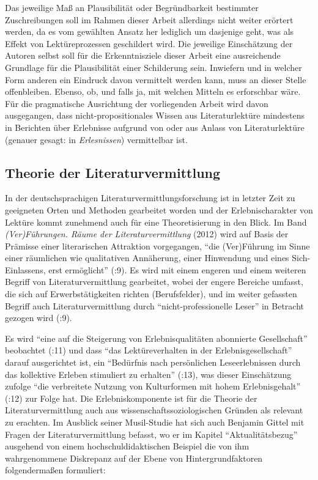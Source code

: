 \documentclass[fontsize=12pt]{scrartcl}
\begin{document}
Das jeweilige Ma{\ss} an Plausibilit\"at oder Begr\"undbarkeit bestimmter Zuschreibungen soll im Rahmen dieser Arbeit al\-ler\-dings nicht weiter er\"ortert werden, da es vom gew\"ahlten Ansatz her lediglich um dasjenige geht, was als Effekt von Lek\-t\"u\-re\-pro\-zessen geschil\-dert wird. Die jeweilige Einsch\"atzung der Autoren\textsuperscript{\tiny *} selbst soll f\"ur die Erkenntnisziele dieser Arbeit eine ausreichende Grundlage f\"ur die Plausibilit\"at einer Schil\-de\-rung sein. Inwiefern und in welcher Form anderen ein Eindruck davon vermittelt werden kann, muss an dieser Stelle offenbleiben. Ebenso, ob, und falls ja, mit welchen Mitteln es erforschbar w\"are. F\"ur die pragmatische Ausrichtung der vorliegenden Arbeit wird davon ausgegangen, dass nicht-pro\-po\-si\-ti\-o\-na\-les Wissen aus Li\-te\-ra\-tur\-lekt\"ure mindestens in Berichten \"uber Erlebnisse aufgrund von oder aus Anlass von Li\-te\-ra\-tur\-lek\-t\"u\-re (genauer gesagt: in \textit{Erlesnissen}) vermittelbar ist.

\subsection{Theorie der Literaturvermittlung}
\label{subsec:3.2}

In der deutschspra\-chi\-gen Li\-te\-ra\-tur\-ver\-mitt\-lungsfor\-schung ist in letzter Zeit zu ge\-eig\-neten Orten und Methoden gearbeitet worden und der Erlebnischarakter von Lekt\"ure kommt zunehmend auch f\"ur eine Theo\-retisierung in den Blick. Im Band \textit{(Ver)F\"uh\-rungen. R\"aume der Li\-te\-ra\-tur\-ver\-mitt\-lung} (2012) wird auf Basis der Pr\"a\-mis\-se einer li\-te\-ra\-rischen Attraktion vorgegangen, "`die (Ver)F\"uh\-rung im Sinne einer r\"aum\-li\-chen wie qualitativen Ann\"aherung, einer Hinwendung und eines Sich-Einlassens, erst er\-m\"oglicht"' (\cite{Disoskietal2012}:9). Es wird mit einem engeren und einem weiteren Begriff von Li\-te\-ra\-tur\-ver\-mitt\-lung gearbeitet, wobei der engere Bereiche umfasst, die sich auf Erwerbst\"atigkei\-ten richten (Berufsfelder), und im weiter gefassten Begriff auch Li\-te\-ra\-tur\-ver\-mitt\-lung durch "`nicht-professionelle Leser"' in Betracht gezogen wird (\cite{NeuhausRuf2010}:9).

Es wird "`eine auf die Steigerung von Erlebnisqualit\"aten abonnierte Ge\-sell\-schaft"' beobachtet (\cite{Beileinetal2012}:11) und dass "`das Lekt\"ure\-verhalten in der \flq Erlebnisge\-sell\-schaft\frq"' darauf ausgerichtet ist, ein "`Bed\"urfnis nach pers\"onlichen Leseerlebnissen durch das kollektive Erleben stimuliert zu erhalten"' (\cite{Beileinetal2012}:13), was dieser Einsch\"atzung zufolge "`die verbreitete Nutzung von Kulturformen mit hohem \flq Erlebnisgehalt\frq"' (\cite{Beileinetal2012}:12) zur Folge hat. Die Erlebniskomponente ist f\"ur die Theorie der Li\-te\-ra\-tur\-ver\-mitt\-lung auch aus wissenschaftssoziologischen Gr\"unden als relevant zu erachten. Im Ausblick seiner Musil-Studie hat sich auch Benjamin Gittel mit Fragen der Li\-te\-ra\-tur\-ver\-mitt\-lung befasst, wo er im Kapitel "`Aktualit\"atsbezug"' ausgehend von einem hochschuldidaktischen Beispiel die von ihm wahrgenommene Diskrepanz auf der Ebene von Hintergrundfaktoren folgenderma{\ss}en formuliert: 
\end{document}
